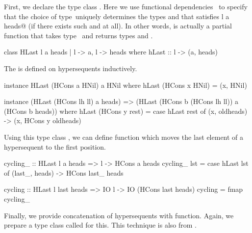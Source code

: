 First, we declare the type class \verb@HLast@.
Here we use functional dependencies~\citep{mark_jones2000} to specify
that the choice of type~\verb@l@ uniquely determines the types \verb@a@ and
\verb@heads@ that satisfies \verb@HLast l a heads@ (if there exists such
\verb@a@ and \verb@heads@ at all).
In other words, \verb@HLast@ is actually a partial function that takes
type~\verb@l@
and returns types \verb@a@ and \verb@heads@.
\begin{code}
class HLast l a heads | l -> a, l -> heads
 where hLast :: l -> (a, heads)
\end{code}
The \verb@HLast@ is defined on hypersequents inductively.
\begin{code}
instance HLast (HCons a HNil) a HNil
    where hLast (HCons x HNil) = (x, HNil)

instance (HLast (HCons lh ll) a heads) =>
  (HLast (HCons b (HCons lh ll)) a (HCons b heads))
    where hLast (HCons y rest) =
              case hLast rest of
                (x, oldheads) -> (x, HCons y oldheads)
\end{code}
Using this type class \verb@HLast@, we can define \verb@cycling@ function
which moves the last element of a hypersequent to the first position.
\begin{code}
cycling_ :: HLast l a heads => l -> HCons a heads
cycling_ lst = case hLast lst of
                (last_, heads) -> HCons last_ heads

cycling :: HLast l last heads => IO l -> IO (HCons last heads)
cycling = fmap cycling_
\end{code}
Finally, we provide concatenation of hypersequents with \verb@follows@
function.
Again, we prepare a type class called \verb@HAppend@ for this.
This technique is also from \citet{hetero}.


